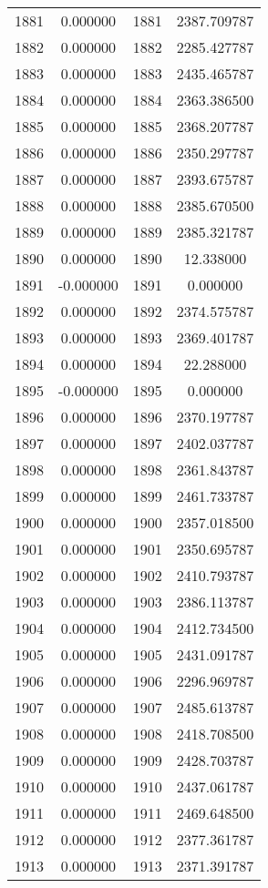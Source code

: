\documentclass[12pt]{article}
\begin{document}
\begin{longtable}{@{}cccc@{}}
1881 & 0.000000 & 1881 & 2387.709787 \\
1882 & 0.000000 & 1882 & 2285.427787 \\
1883 & 0.000000 & 1883 & 2435.465787 \\
1884 & 0.000000 & 1884 & 2363.386500 \\
1885 & 0.000000 & 1885 & 2368.207787 \\
1886 & 0.000000 & 1886 & 2350.297787 \\
1887 & 0.000000 & 1887 & 2393.675787 \\
1888 & 0.000000 & 1888 & 2385.670500 \\
1889 & 0.000000 & 1889 & 2385.321787 \\
1890 & 0.000000 & 1890 & 12.338000 \\
1891 & -0.000000 & 1891 & 0.000000 \\
1892 & 0.000000 & 1892 & 2374.575787 \\
1893 & 0.000000 & 1893 & 2369.401787 \\
1894 & 0.000000 & 1894 & 22.288000 \\
1895 & -0.000000 & 1895 & 0.000000 \\
1896 & 0.000000 & 1896 & 2370.197787 \\
1897 & 0.000000 & 1897 & 2402.037787 \\
1898 & 0.000000 & 1898 & 2361.843787 \\
1899 & 0.000000 & 1899 & 2461.733787 \\
1900 & 0.000000 & 1900 & 2357.018500 \\
1901 & 0.000000 & 1901 & 2350.695787 \\
1902 & 0.000000 & 1902 & 2410.793787 \\
1903 & 0.000000 & 1903 & 2386.113787 \\
1904 & 0.000000 & 1904 & 2412.734500 \\
1905 & 0.000000 & 1905 & 2431.091787 \\
1906 & 0.000000 & 1906 & 2296.969787 \\
1907 & 0.000000 & 1907 & 2485.613787 \\
1908 & 0.000000 & 1908 & 2418.708500 \\
1909 & 0.000000 & 1909 & 2428.703787 \\
1910 & 0.000000 & 1910 & 2437.061787 \\
1911 & 0.000000 & 1911 & 2469.648500 \\
1912 & 0.000000 & 1912 & 2377.361787 \\
1913 & 0.000000 & 1913 & 2371.391787 \\

\end{longtable}
\end{document}
